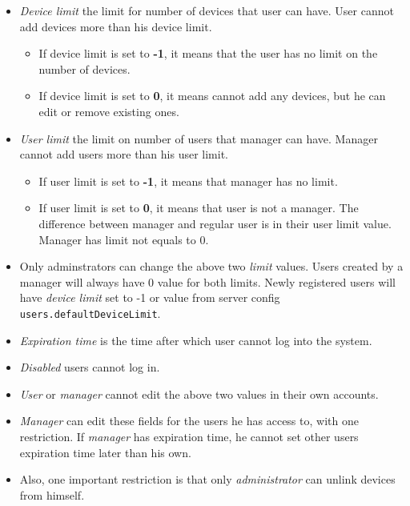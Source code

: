 \documentclass[a4paper]{article}
\begin{document}
\begin{itemize}
    \item \emph{Device limit} the limit for number of devices that user can have. User cannot add devices more than his device limit.
          \begin{itemize}
              \item If device limit is set to \textbf{-1}, it means that the user has no limit on the number of devices.
              \item If device limit is set to \textbf{0}, it means cannot add any devices, but he can edit or remove existing ones.
          \end{itemize}
    \item \emph{User limit} the limit on number of users that manager can have. Manager cannot add users more than his user limit.
          \begin{itemize}
              \item If user limit is set to \textbf{-1}, it means that manager has no limit.
              \item If user limit is set to \textbf{0}, it means that user is not a manager. The difference between manager and
                    regular user is in their user limit value. Manager has limit not equals to 0.
          \end{itemize}
    \item Only adminstrators can change the above two \emph{limit} values. Users created by a manager will always have 0 value for both
          limits. Newly registered users will have \emph{device limit} set to -1 or value from server config 
          \lstinline{users.defaultDeviceLimit}.
    \item \emph{Expiration time} is the time after which user cannot log into the system.
    \item \emph{Disabled} users cannot log in.
    \item \emph{User} or \emph{manager} cannot edit the above two values in their own accounts.
    \item \emph{Manager} can edit these fields for the users he has access to, with one restriction. If \emph{manager} has expiration
          time, he cannot set other users expiration time later than his own.
    \item Also, one important restriction is that only \emph{administrator} can unlink devices from himself.
\end{itemize}
\end{document}
